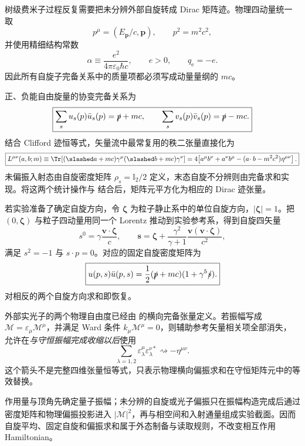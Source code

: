 
树级费米子过程反复需要把未分辨外部自旋转成 Dirac 矩阵迹。物理四动量统一取
\begin{equation*}
 p^\mu=(E_{\mathbf p}/c,\mathbf p),
 \qquad p^2=m^2c^2,
\end{equation*}
并使用精细结构常数
\begin{equation*}
 \alpha\equiv\frac{e^2}{4\pi\varepsilon_0\hbar c},
 \qquad e>0,
 \qquad q_{\mathrm e}=-e.
\end{equation*}
因此所有自旋子完备关系中的质量项都必须写成动量量纲的 \(mc\)。

正、负能自由旋量的协变完备关系为
\begin{equation}
 \boxed{
 \sum_su_s(p)\bar u_s(p)=\slashed p+mc,
 \qquad
 \sum_sv_s(p)\bar v_s(p)=\slashed p-mc.}
 \label{eq:spin-sum-si-r9}
\end{equation}
结合 Clifford 迹恒等式，矢量流中最常复用的秩二张量直接化为
\begin{equation}
 \boxed{
 L^{\mu\nu}(a,b;m)
 \equiv
 \Tr[(\slashed a+mc)\gamma^\mu(\slashed b+mc)\gamma^\nu]
 =4\!
 \left[a^\mu b^\nu+a^\nu b^\mu
 -(a\!\cdot b-m^2c^2)\eta^{\mu\nu}\right].}
 \label{eq:qed-basic-tensor-si-r9}
\end{equation}
未偏振入射态由自旋密度矩阵 $\rho_s=\mathbb I_2/2$ 定义，末态自旋不分辨则由完备求和实现。将这两个统计操作与 结合后，矩阵元平方化为相应的 Dirac 迹张量。

若实验准备了确定自旋方向，令 \(\boldsymbol\zeta\) 为粒子静止系中的单位自旋方向，\(|\boldsymbol\zeta|=1\)。把 \((0,\boldsymbol\zeta)\) 与粒子四动量用同一个 Lorentz 推动到实验参考系，得到自旋四矢量
\begin{equation}
 \boxed{
 s^0=\gamma\frac{\mathbf v\!\cdot\boldsymbol\zeta}{c},
 \qquad
 \mathbf s
 =\boldsymbol\zeta
 +\frac{\gamma^2}{\gamma+1}
 \frac{\mathbf v(\mathbf v\!\cdot\boldsymbol\zeta)}{c^2},}
 \label{eq:spin-fourvector-r9}
\end{equation}
满足 \(s^2=-1\) 与 \(s\!\cdot p=0\)。对应的固定自旋密度矩阵为
\begin{equation}
 \boxed{
 u(p,s)\bar u(p,s)
 =\frac12(\slashed p+mc)(1+\gamma^5\slashed s).}
 \label{eq:polarized-spinor-projector-r9}
\end{equation}
对相反的两个自旋方向求和即恢复。

外部实光子的两个物理自由度已经由 的横向完备张量定义。若振幅写成 \(\mathcal M=\varepsilon_\mu\mathcal M^\mu\)，并满足 Ward 条件 \(k_\mu\mathcal M^\mu=0\)，则辅助参考矢量相关项全部消失， 允许在\emph{与守恒振幅完成收缩以后}使用
\begin{equation*}
 \sum_{\lambda=1,2}
 \varepsilon_\lambda^\mu\varepsilon_\lambda^{\nu *}
 \rightsquigarrow-\eta^{\mu\nu}.
\end{equation*}
这个箭头不是完整四维张量恒等式，只表示物理横向偏振求和在守恒矩阵元中的等效替换。

作用量与顶角先确定量子振幅；未分辨的自旋或光子偏振只在振幅构造完成后通过密度矩阵和物理偏振投影进入 $\overline{|\mathcal M|^2}$，再与相空间和入射通量组成实验截面。因而自旋平均、固定自旋和偏振求和属于外态制备与读取规则，不改变相互作用 Hamiltonian。

